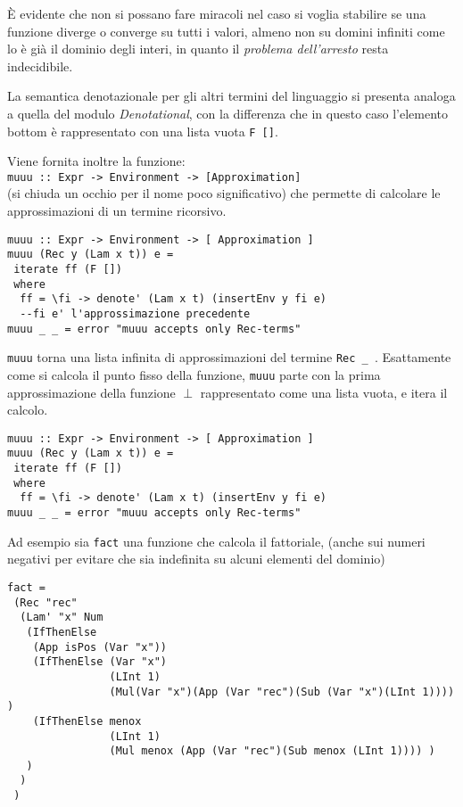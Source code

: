 \documentclass{article}
\begin{document}
È evidente che non si possano fare miracoli nel caso si voglia stabilire se una funzione diverge o converge su tutti i valori, almeno non su domini infiniti come lo è già il dominio degli interi, in quanto il \emph{problema dell'arresto} resta indecidibile.

La semantica denotazionale per gli altri termini del linguaggio si presenta analoga a quella del modulo \emph{Denotational}, con la differenza che in questo caso l'elemento bottom è rappresentato con una lista vuota \texttt{F []}.

Viene fornita inoltre la funzione:\\
 \texttt{muuu :: Expr -> Environment -> [Approximation]}\\
(si chiuda un occhio per il nome poco significativo) che permette di calcolare le approssimazioni di un termine ricorsivo.

\begin{verbatim}
muuu :: Expr -> Environment -> [ Approximation ]
muuu (Rec y (Lam x t)) e =
 iterate ff (F [])
 where
  ff = \fi -> denote' (Lam x t) (insertEnv y fi e) 
  --fi e' l'approssimazione precedente
muuu _ _ = error "muuu accepts only Rec-terms"
\end{verbatim}

\texttt{muuu} torna una lista infinita di approssimazioni del termine \texttt{Rec \_ }. Esattamente come si calcola il punto fisso della funzione, \texttt{muuu} parte con la prima approssimazione della funzione $\perp$ rappresentato come una lista vuota, e itera il calcolo.

\begin{verbatim}
muuu :: Expr -> Environment -> [ Approximation ]
muuu (Rec y (Lam x t)) e =
 iterate ff (F [])
 where
  ff = \fi -> denote' (Lam x t) (insertEnv y fi e) 
muuu _ _ = error "muuu accepts only Rec-terms"
\end{verbatim}

Ad esempio sia \texttt{fact} una funzione che calcola il fattoriale, (anche sui numeri negativi per evitare che sia indefinita su alcuni elementi del dominio)

\begin{verbatim}
fact =
 (Rec "rec"
  (Lam' "x" Num
   (IfThenElse
    (App isPos (Var "x"))
    (IfThenElse (Var "x") 
                (LInt 1) 
                (Mul(Var "x")(App (Var "rec")(Sub (Var "x")(LInt 1)))) )
    (IfThenElse menox 
                (LInt 1) 
                (Mul menox (App (Var "rec")(Sub menox (LInt 1)))) )
   )
  )
 ) 
\end{verbatim}
\end{document}
